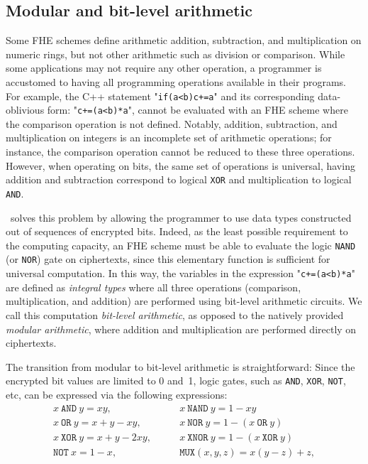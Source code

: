 \subsection{Modular and bit-level arithmetic}\label{ss:modcom}

Some FHE schemes define arithmetic addition, subtraction, and multiplication on numeric rings, but not other arithmetic such as division or comparison. While some applications may not require any other operation, a programmer is accustomed to having all programming operations available in their programs.
For example, the C++ statement "{\tt{}if(a<b)c+=a}" and its corresponding data-oblivious form: "{\tt{}c+=(a<b)*a}", cannot be evaluated with an FHE scheme where the comparison operation is not defined.
Notably, addition, subtraction, and multiplication on integers is an incomplete set of arithmetic operations; for instance, the comparison operation cannot be reduced to these three operations. However, when operating on bits, the same set of operations is universal, having addition and subtraction correspond to logical \texttt{XOR} and multiplication to logical \texttt{AND}.

\eee\ solves this problem by allowing the programmer to use data types constructed out of sequences of encrypted bits. Indeed, as the least possible requirement to the computing capacity, an FHE scheme must be able to evaluate the logic \texttt{NAND} (or \texttt{NOR}) gate on ciphertexts, since this elementary function is sufficient for universal computation. 
In this way, the variables in the expression "{\tt{}c+=(a<b)*a}" are defined as \emph{integral types} where all three operations (comparison, multiplication, and addition) are performed using bit-level arithmetic circuits. We call this computation {\it bit-level arithmetic}, as opposed to the natively provided {\it modular arithmetic}, where addition and multiplication are performed directly on ciphertexts.

The transition from modular to bit-level arithmetic is straightforward: Since
the encrypted bit values are limited to 0 and~1, logic gates, such as \texttt{AND}, \texttt{XOR}, \texttt{NOT}, etc, can be expressed via the following expressions:
\vspace{-0.2cm}
\begin{equation*}\label{eq:logic}
\begin{split}
x \ \texttt{AND} \ y = xy,& \qquad x \ \texttt{NAND} \ y = 1-xy \\
x \ \texttt{OR} \ y = x+y-xy,& \qquad x \ \texttt{NOR} \ y = 1-(x \ \texttt{OR} \ y) \\
x \ \texttt{XOR} \ y = x+y-2xy,& \qquad x \ \texttt{XNOR} \ y = 1-(x \ \texttt{XOR} \ y) \\
 \texttt{NOT} \ x = 1-x,& \qquad \texttt{MUX}(x,y,z) = x(y-z)+z, \\
\end{split}
\end{equation*}

